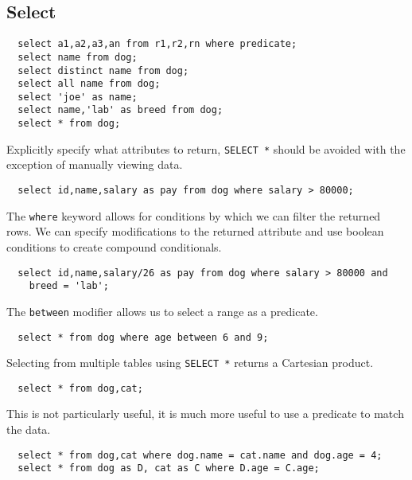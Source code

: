 \documentclass{math}
\begin{document}
\subsection*{Select}
\begin{lstlisting}
  select a1,a2,a3,an from r1,r2,rn where predicate;
  select name from dog;
  select distinct name from dog;
  select all name from dog;
  select 'joe' as name;
  select name,'lab' as breed from dog;
  select * from dog;
\end{lstlisting}
Explicitly specify what attributes to return, \texttt{SELECT *} should be
avoided with the exception of manually viewing data.
\begin{lstlisting}
  select id,name,salary as pay from dog where salary > 80000;
\end{lstlisting}
The \texttt{where} keyword allows for conditions by which we can filter the
returned rows. We can specify modifications to the returned attribute and use
boolean conditions to create compound conditionals.
\begin{lstlisting}
  select id,name,salary/26 as pay from dog where salary > 80000 and
    breed = 'lab';
\end{lstlisting}
The \texttt{between} modifier allows us to select a range as a predicate.
\begin{lstlisting}
  select * from dog where age between 6 and 9;
\end{lstlisting}
Selecting from multiple tables using \texttt{SELECT *} returns a Cartesian
product.
\begin{lstlisting}
  select * from dog,cat;
\end{lstlisting}
This is not particularly useful, it is much more useful to use a predicate to
match the data.
\begin{lstlisting}
  select * from dog,cat where dog.name = cat.name and dog.age = 4;
  select * from dog as D, cat as C where D.age = C.age;
\end{lstlisting}
\end{document}
